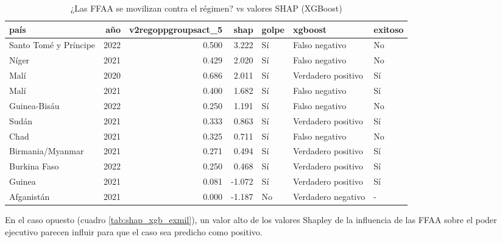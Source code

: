 \documentclass{article}
\begin{document}
  \begin{table}[H]
    \centering
    \begin{tabular}{lrrrlll}
      \toprule
      país & año & v2regoppgroupsact\_5 & shap & golpe & xgboost & exitoso \\
      \midrule
      Santo Tomé y Príncipe & 2022 & 0.500 & 3.222 & Sí & Falso negativo & No \\
      Níger & 2021 & 0.429 & 2.020 & Sí & Falso negativo & No \\
      Malí & 2020 & 0.686 & 2.011 & Sí & Verdadero positivo & Sí \\
      Malí & 2021 & 0.400 & 1.682 & Sí & Falso negativo & Sí \\
      Guinea-Bisáu & 2022 & 0.250 & 1.191 & Sí & Falso negativo & No \\
      Sudán & 2021 & 0.333 & 0.863 & Sí & Verdadero positivo & Sí \\
      Chad & 2021 & 0.325 & 0.711 & Sí & Falso negativo & No \\
      Birmania/Myanmar & 2021 & 0.271 & 0.494 & Sí & Verdadero positivo & Sí \\
      Burkina Faso & 2022 & 0.250 & 0.468 & Sí & Verdadero positivo & Sí \\
      Guinea & 2021 & 0.081 & -1.072 & Sí & Verdadero positivo & Sí \\
      Afganistán & 2021 & 0.000 & -1.187 & No & Verdadero negativo & - \\
      \bottomrule
    \end{tabular}
    \caption{¿Las FFAA se movilizan contra el régimen? vs valores SHAP (XGBoost) \label{tab:shap_xgb_regopp}}
  \end{table}

  En el caso opuesto (cuadro \ref{tab:shap_xgb_exmil}), un valor alto de los valores 
  Shapley de la influencia de las FFAA sobre el poder ejecutivo parecen influir para 
  que el caso sea predicho como positivo.
\end{document}
